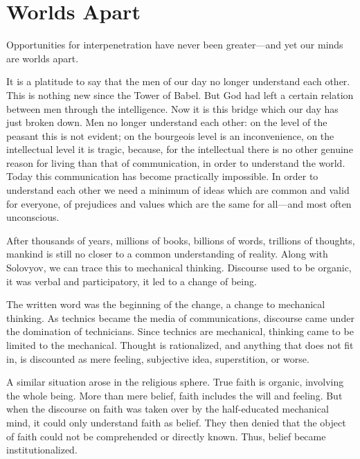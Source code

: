 \section{Worlds Apart}

\begin{quotex}
Opportunities for interpenetration have never been greater---and yet our minds are worlds apart.


\end{quotex}


\begin{quotex}
It is a platitude to say that the men of our day no longer understand each other. This is nothing new since the Tower of Babel. But God had left a certain relation between men through the intelligence. Now it is this bridge which our day has just broken down. Men no longer understand each other: on the level of the peasant this is not evident; on the bourgeois level is an inconvenience, on the intellectual level it is tragic, because, for the intellectual there is no other genuine reason for living than that of communication, in order to understand the world. Today this communication has become practically impossible. In order to understand each other we need a minimum of ideas which are common and valid for everyone, of prejudices and values which are the same for all---and most often unconscious.


\end{quotex}


After thousands of years, millions of books, billions of words, trillions of thoughts, mankind is still no closer to a common understanding of reality. Along with Solovyov, we can trace this to mechanical thinking. Discourse used to be organic, it was verbal and participatory, it led to a change of being.

The written word was the beginning of the change, a change to mechanical thinking. As technics became the media of communications, discourse came under the domination of technicians. Since technics are mechanical, thinking came to be limited to the mechanical. Thought is rationalized, and anything that does not fit in, is discounted as mere feeling, subjective idea, superstition, or worse.

A similar situation arose in the religious sphere. True faith is organic, involving the whole being. More than mere belief, faith includes the will and feeling. But when the discourse on faith was taken over by the half-educated mechanical mind, it could only understand faith as belief. They then denied that the object of faith could not be comprehended or directly known. Thus, belief became institutionalized.

